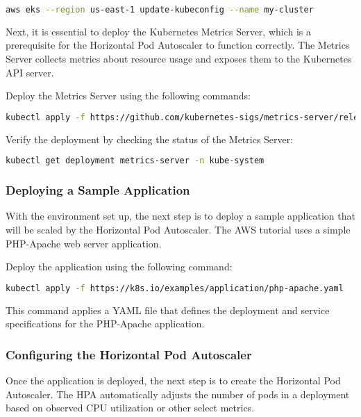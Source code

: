 \begin{lstlisting}[language=bash]
aws eks --region us-east-1 update-kubeconfig --name my-cluster
\end{lstlisting}

Next, it is essential to deploy the Kubernetes Metrics Server, which is a prerequisite for the Horizontal Pod Autoscaler to function correctly. The Metrics Server collects metrics about resource usage and exposes them to the Kubernetes API server.

Deploy the Metrics Server using the following commands:

\begin{lstlisting}[language=bash]
kubectl apply -f https://github.com/kubernetes-sigs/metrics-server/releases/latest/download/components.yaml
\end{lstlisting}

Verify the deployment by checking the status of the Metrics Server:

\begin{lstlisting}[language=bash]
kubectl get deployment metrics-server -n kube-system
\end{lstlisting}

\subsubsection{Deploying a Sample Application}

With the environment set up, the next step is to deploy a sample application that will be scaled by the Horizontal Pod Autoscaler. The AWS tutorial uses a simple PHP-Apache web server application.

Deploy the application using the following command:

\begin{lstlisting}[language=bash]
kubectl apply -f https://k8s.io/examples/application/php-apache.yaml
\end{lstlisting}

This command applies a YAML file that defines the deployment and service specifications for the PHP-Apache application.

\subsubsection{Configuring the Horizontal Pod Autoscaler}

Once the application is deployed, the next step is to create the Horizontal Pod Autoscaler. The HPA automatically adjusts the number of pods in a deployment based on observed CPU utilization or other select metrics.

